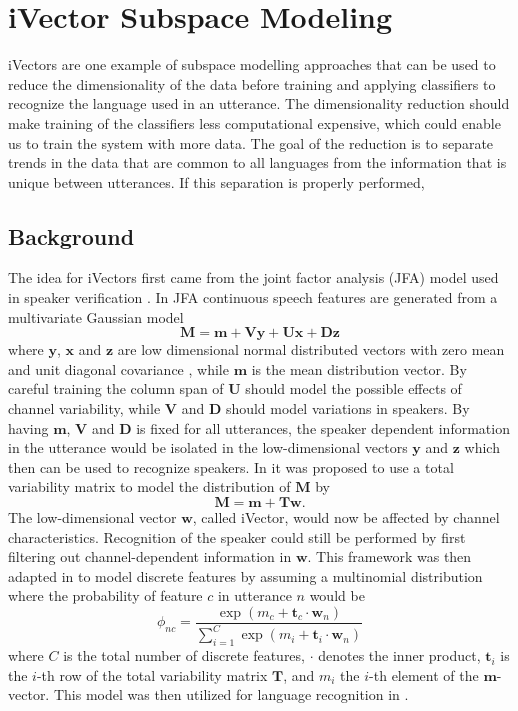 \chapter{iVector Subspace Modeling}

iVectors are one example of subspace modelling approaches that can be used to reduce the dimensionality of the data before training and applying classifiers to recognize the language used in an utterance. The dimensionality reduction should make training of the classifiers less computational expensive, which could enable us to train the system with more data. The goal of the reduction is to separate trends in the data that are common to all languages from the information that is unique between utterances. If this separation is properly performed, 

\section{Background}

The idea for iVectors first came from the joint factor analysis (JFA) model used in speaker verification \cite{dehak2011front}. In JFA continuous speech features are generated from a multivariate Gaussian model
\begin{equation}
\label{jfa}
\mathbf{M}=\mathbf{m}+\mathbf{Vy}+\mathbf{Ux}+\mathbf{Dz}
\end{equation}
where $\mathbf{y}$, $\mathbf{x}$ and $\mathbf{z}$ are low dimensional normal distributed vectors with zero mean and unit diagonal covariance \cite{dehak2011front}, while $\mathbf{m}$ is the mean distribution vector. By careful training the column span of $\mathbf{U}$ should model the possible effects of channel variability, while $\mathbf{V}$ and $\mathbf{D}$ should model variations in speakers. By having $\mathbf{m}$, $\mathbf{V}$ and $\mathbf{D}$ is fixed for all utterances, the speaker dependent information in the utterance would be isolated in the low-dimensional vectors $\mathbf{y}$ and $\mathbf{z}$ which then can be used to recognize speakers. In \cite{dehak2011front} it was proposed to use a total variability matrix to model the distribution of $\mathbf{M}$ by
\begin{equation}
\label{ffa}
\mathbf{M}=\mathbf{m}+\mathbf{Tw}.
\end{equation}
The low-dimensional vector $\mathbf{w}$, called iVector, would now be affected by channel characteristics. Recognition of the speaker could still be performed by first filtering out channel-dependent information in $\mathbf{w}$. This framework was then adapted in \cite{svivector} to model discrete features by assuming a multinomial distribution where the probability of feature $c$ in utterance $n$ would be 
\begin{equation}
\label{phieq}
\phi_{nc}=\frac{\exp(m_c+\mathbf{t}_c \cdot \mathbf{w}_n)}{\sum_{i=1}^C \exp(m_i+\mathbf{t}_i \cdot \mathbf{w}_n)}
\end{equation}
where $C$ is the total number of discrete features, $\cdot$ denotes the inner product, $\mathbf{t}_i$ is the $i$-th row of the total variability matrix $\mathbf{T}$, and $m_i$ the $i$-th element of the $\mathbf{m}$-vector. This model was then utilized for language recognition in \cite{lrivector}.

